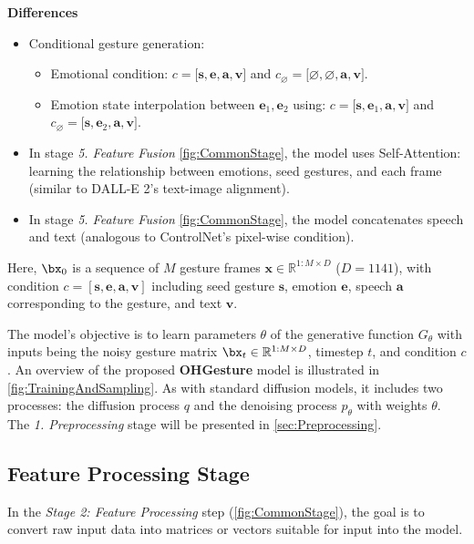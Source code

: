 \textbf{Differences}
\begin{itemize}
	\item Conditional gesture generation:
	\begin{itemize}
		\item Emotional condition: $c = \big[ \mathbf{s}, \mathbf{e}, \mathbf{a}, \mathbf{v} \big]$ and $c_{\varnothing} = \big[ \varnothing, \varnothing, \mathbf{a}, \mathbf{v}\big]$.
		\item Emotion state interpolation between $\mathbf{e}_1, \mathbf{e}_2$ using: $c = \big[ \mathbf{s}, \mathbf{e}_1, \mathbf{a}, \mathbf{v} \big]$ and $c_{\varnothing} = \big[ \mathbf{s}, \mathbf{e}_2, \mathbf{a}, \mathbf{v} \big]$.
	\end{itemize}
	\item In stage \textit{5. Feature Fusion} \autoref{fig:CommonStage}, the model uses Self-Attention: learning the relationship between emotions, seed gestures, and each frame (similar to DALL-E 2's text-image alignment).
	\item In stage \textit{5. Feature Fusion} \autoref{fig:CommonStage}, the model concatenates speech and text (analogous to ControlNet's pixel-wise condition).
\end{itemize}

Here, $\bx_0$ is a sequence of $M$ gesture frames $\mathbf{x} \in \mathbb{R}^{1:M \times D}$ ($D = 1141$), with condition $c = [\mathbf{s}, \mathbf{e}, \mathbf{a}, \mathbf{v}]$ including seed gesture $\mathbf{s}$, emotion $\mathbf{e}$, speech $\mathbf{a}$ corresponding to the gesture, and text $\mathbf{v}$.

The model's objective is to learn parameters $\theta$ of the generative function $G_{\theta}$ with inputs being the noisy gesture matrix $\bx_t \in \mathbb{R}^{1:M \times D}$, timestep $t$, and condition $c$. An overview of the proposed \textbf{OHGesture} model is illustrated in \autoref{fig:TrainingAndSampling}. As with standard diffusion models, it includes two processes: the diffusion process $q$ and the denoising process $p_{\theta}$ with weights $\theta$. The \textit{1. Preprocessing} stage will be presented in \autoref{sec:Preprocessing}.


\subsection{Feature Processing Stage}

In the \textit{Stage 2: Feature Processing} step (\autoref{fig:CommonStage}), the goal is to convert raw input data into matrices or vectors suitable for input into the model.

